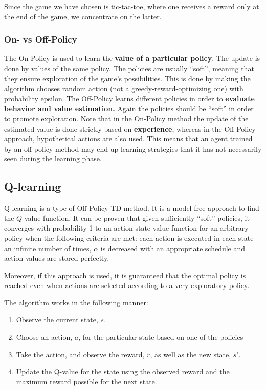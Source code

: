 \documentclass[fleqn]{article}
\begin{document}
Since the game we have chosen is tic-tac-toe, where one receives a reward only at the end of the game, we concentrate on the latter.  

\subsubsection{On- vs Off-Policy}
The On-Policy is used to learn the \textbf{value of a particular policy}. The update is done by values of the same policy. The policies are usually “soft”, meaning that they ensure exploration of the game's possibilities. This is done by making the algorithm chooses random action (not a greedy-reward-optimizing one) with probability epsilon. 
The Off-Policy learns different policies in order to  \textbf{evaluate behavior and value estimation.} Again the policies should be “soft” in order to promote exploration. Note that in the On-Policy method the update of the estimated value is done strictly based on  \textbf{experience}, whereas in the Off-Policy approach, hypothetical actions are also used. This means that an agent trained by an off-policy method may end up learning strategies that it has not necessarily seen during the learning phase.

\subsection{Q-learning}
Q-learning is a type of Off-Policy TD method. It is a model-free approach to find the $Q$ value function. It can be proven that given sufficiently “soft” policies, it converges with probability 1 to an action-state value function for an arbitrary policy when the following criteria are met: each action is executed in each state an infinite number of times, $\alpha$ is decreased with an appropriate schedule and action-values are stored perfectly.

Moreover, if this approach is used, it is guaranteed that the optimal policy is reached even when actions are selected according to a very exploratory policy.   

The algorithm works in the following manner:  

\begin{enumerate}
	\item Observe the current state, $s$.  
	\item  Choose an action, $a$, for the particular state based on one of the policies
	\item Take the action, and observe the reward, $r$, as well as the new state, $s'$.
	\item  Update the Q-value for the state using the observed reward and the maximum reward possible for the next state.
\end{enumerate}
\end{document}
